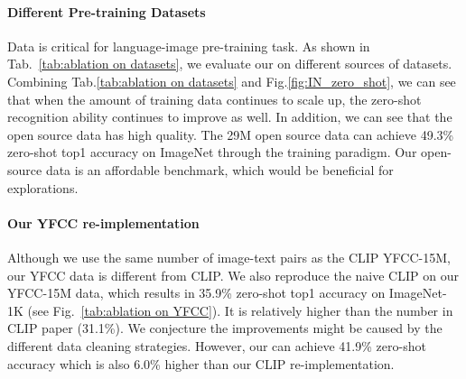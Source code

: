 \paragraph{Different Pre-training Datasets}
Data is critical for language-image pre-training task. 
As shown in Tab.~\ref{tab:ablation on datasets}, we evaluate our \workname on different sources of datasets.
Combining Tab.\ref{tab:ablation on datasets} and Fig.\ref{fig:IN_zero_shot}, we can see that when the amount of training data continues to scale up, the zero-shot recognition ability continues to improve as well. In addition, we can see that the open source data has high quality. 
The 29M open source data can achieve 49.3\% zero-shot top1 accuracy on ImageNet through the \workname training paradigm.
Our open-source data is an affordable benchmark, which would be beneficial for explorations.





\paragraph{Our YFCC re-implementation}

Although we use the same number of image-text pairs as the CLIP YFCC-15M, our YFCC data is different from CLIP. We also reproduce the naive CLIP on our YFCC-15M data, which results in 35.9\% zero-shot top1 accuracy on ImageNet-1K (see Fig.~\ref{tab:ablation on YFCC}). It is relatively higher than the number in CLIP paper (31.1\%). We conjecture the improvements might be caused by the different data cleaning strategies. However, our \workname can achieve 41.9\% zero-shot accuracy which is also 6.0\% higher than our CLIP re-implementation.

